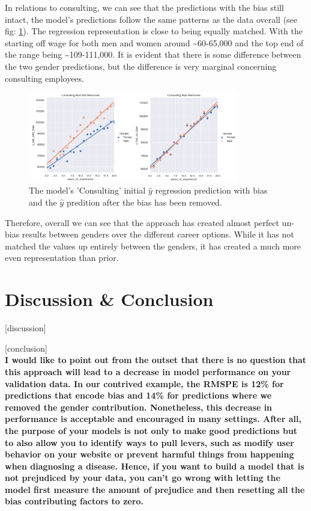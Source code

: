 \documentclass{sigchi}
\begin{document}
	In relations to consulting, we can see that the predictions with the bias still intact, the model's predictions follow the same patterns as the data overall (see fig: \ref{fig:consulting_comparison}).  The regression representation is close to being equally matched. With the starting off wage for both men and women around \textasciitilde{60-65,000} and the top end of the range being \textasciitilde{109-111,000}. It is evident that there is some difference between the two gender predictions, but the difference is very marginal concerning consulting employees. 

	\begin{figure}[h]
		\includegraphics[width=9.2cm]{consulting_comparison.png}
		\caption{The model's 'Consulting' initial $\hat{y}$ regression prediction with bias and the $\hat{y}$ predition after the bias has been removed.}
		\label{fig:consulting_comparison}
		\centering
	\end{figure}

	Therefore, overall we can see that the approach has created almost perfect un-bias results between genders over the different career options. While it has not matched the values up entirely between the genders, it has created a much more even representation than prior. 


\section{Discussion \& Conclusion}
	[discussion]
	
	[conclusion] \\
	\textbf{I would like to point out from the outset that there is no question that this approach will lead to a decrease in model performance on your validation data. In our contrived example, the RMSPE is 12\% for predictions that encode bias and 14\% for predictions where we removed the gender contribution. Nonetheless, this decrease in performance is acceptable and encouraged in many settings. After all, the purpose of your models is not only to make good predictions but to also allow you to identify ways to pull levers, such as modify user behavior on your website or prevent harmful things from happening when diagnosing a disease. Hence, if you want to build a model that is not prejudiced by your data, you can’t go wrong with letting the model first measure the amount of prejudice and then resetting all the bias contributing factors to zero.}


\newpage
\balance{}


\end{document}
